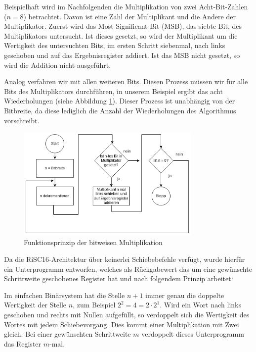 \documentclass[fleqn, a4paper, 11pt]{article}       %
\begin{document}
Beispielhaft wird im Nachfolgenden die Multiplikation von zwei Acht-Bit-Zahlen \\ ($n = 8$) betrachtet. Davon ist eine Zahl der Multiplikant und die Andere der Multiplikator. Zuerst wird das Most Significant Bit (MSB), das siebte Bit, des Multiplikators untersucht. Ist dieses gesetzt, so wird der Multiplikant um die Wertigkeit des untersuchten Bits, im ersten Schritt siebenmal, nach links geschoben und auf das Ergebnisregister addiert. Ist das MSB nicht gesetzt, so wird die Addition nicht ausgeführt. \cite{MULv3}

Analog verfahren wir mit allen weiteren Bits. Diesen Prozess müssen wir für alle Bits des Multiplikators durchführen, in unserem Beispiel ergibt das acht Wiederholungen (siehe Abbildung \ref{fig:bitw_Mul_Prinzip}). Dieser Prozess ist unabhängig von der Bitbreite, da diese lediglich die Anzahl der Wiederholungen des Algorithmus vorschreibt.



\begin{figure}[h]
    \includegraphics[width =0.8\textwidth]{bitweise_Mul_Prinzip.png}
\caption{Funktionsprinzip der bitweisen Multiplikation}
\label{fig:bitw_Mul_Prinzip}
\end{figure}



Da die RiSC16-Architektur über keinerlei Schiebebefehle verfügt, wurde hierfür ein Unterprogramm entworfen, welches als Rückgabewert das um eine gewünschte Schrittweite geschobenes Register hat und nach folgendem Prinzip arbeitet:

Im einfachen Binärsystem hat die Stelle $n+1$ immer genau die doppelte Wertigkeit der Stelle $n$, zum Beispiel $2^2 = 4 = 2 \cdot 2^1$. Wird ein Wort nach links geschoben und  rechts mit Nullen aufgefüllt, so verdoppelt sich die Wertigkeit des Wortes mit jedem Schiebevorgang. Dies kommt einer Multiplikation mit Zwei gleich. Bei einer gewünschten Schrittweite $m$ verdoppelt dieses Unterprogramm das Register  $m$-mal.
\end{document}
